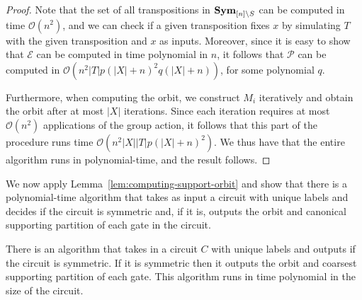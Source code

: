 \documentclass[../main/thesis.tex]{subfiles}
\begin{document}
\begin{proof}
  Note that the set of all transpositions in $\text{\textbf{Sym}}_{[n] \setminus S}$ can be
  computed in time $\mathcal{O}(n^{2})$, and we can check if a given
  transposition fixes $x$ by simulating $T$ with the given transposition and $x$
  as inputs. Moreover, since it is easy to show that $\mathcal{E}$ can be
  computed in time polynomial in $n$, it follows that $\mathcal{P}$ can be
  computed in $\mathcal{O} (n^2 \vert T \vert p(\vert X \vert +n)^2 q(\vert X
  \vert + n))$, for some polynomial $q$.

  Furthermore, when computing the orbit, we construct $M_i$ iteratively and
  obtain the orbit after at most $\vert X \vert$ iterations. Since each
  iteration requires at most $\mathcal{O} (n^{2})$ applications of the group
  action, it follows that this part of the procedure runs time
  $\mathcal{O}(n^2\vert X \vert \vert T \vert p (\vert X \vert + n)^2)$. We thus
  have that the entire algorithm runs in polynomial-time, and the result
  follows.
\end{proof}

We now apply Lemma~\ref{lem:computing-support-orbit} and show that there is a
polynomial-time algorithm that takes as input a circuit with unique labels and
decides if the circuit is symmetric and, if it is, outputs the orbit and
canonical supporting partition of each gate in the circuit.

\begin{lem}
  There is an algorithm that takes in a circuit $C$ with unique labels and
  outputs if the circuit is symmetric. If it is symmetric then it outputs the
  orbit and coarsest supporting partition of each gate. This algorithm runs in
  time polynomial in the size of the circuit.
  \label{lem:computing-support-orbit-gate}
\end{lem}
\end{document}

